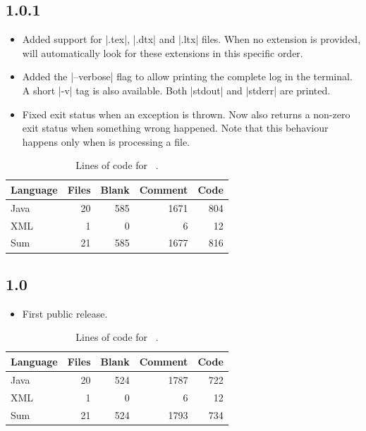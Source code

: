 \documentclass[a4paper,twoside,12pt]{memoir}
\begin{document}
\subsection*{1.0.1}

\begin{itemize}
\item[\featurenew] 
     Added support for |.tex|, |.dtx| and |.ltx| files. When no extension is 
     provided, \arara will automatically look for these extensions in this 
     specific order.
\item[\featurenew] 
     Added the |--verbose| flag to allow printing the complete log in the 
     terminal. A short |-v| tag is also available. Both |stdout| and |stderr| 
     are printed.
\item[\featurefixed] 
     Fixed exit status when an exception is thrown. Now \arara also returns a 
     non-zero exit status when something wrong happened. Note that this 
     behaviour happens only when \arara is processing a file.
\end{itemize}

{\renewcommand{\arraystretch}{1.5}
\begin{table}[ht]
\centering
\begin{tabular}{lrrrr}
\hline
\textbf{Language} & \textbf{Files} & \textbf{Blank} & \textbf{Comment} & \textbf{Code}\\
\hline
\hline
Java & 20 & 585 & 1671 & 804\\
XML & 1 & 0 & 6 & 12\\
\hline
Sum & 21 & 585 & 1677 & 816\\
\hline
\end{tabular}
\caption{Lines of code for \arara\ .}
\label{tab:locarara101}
\end{table}}

\subsection*{1.0}

\begin{itemize}
\item[\featurenew] First public release.
\end{itemize}

{\renewcommand{\arraystretch}{1.5}
\begin{table}[ht]
\centering
\begin{tabular}{lrrrr}
\hline
\textbf{Language} & \textbf{Files} & \textbf{Blank} & \textbf{Comment} & \textbf{Code}\\
\hline
\hline
Java & 20 & 524 & 1787 & 722\\
XML & 1 & 0 & 6 & 12\\
\hline
Sum & 21 & 524 & 1793 & 734\\
\hline
\end{tabular}
\caption{Lines of code for \arara\ .}
\label{tab:locarara10}
\end{table}}
\end{document}

